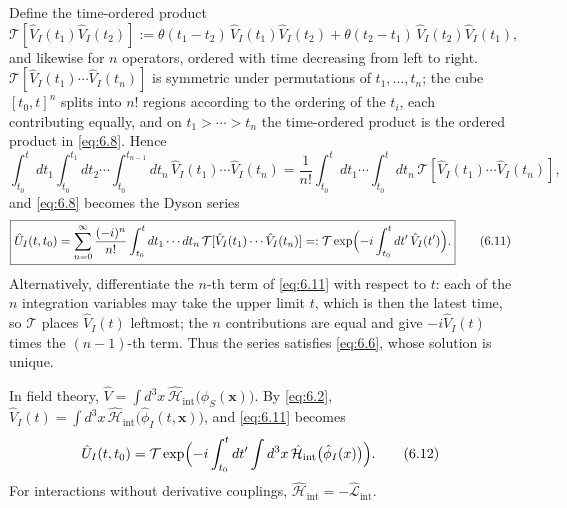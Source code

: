 \documentclass[11pt,a4paper]{article}
\begin{document}
Define the time-ordered product
\begin{equation*}
\mathcal T[\hat V_I(t_1)\hat V_I(t_2)]
:=\theta(t_1-t_2)\,\hat V_I(t_1)\hat V_I(t_2)+\theta(t_2-t_1)\,\hat V_I(t_2)\hat V_I(t_1),
\tag{6.9}\label{eq:6.9}
\end{equation*}
and likewise for $n$ operators, ordered with time decreasing from left to right. $\mathcal T[\hat V_I(t_1)\cdots\hat V_I(t_n)]$ is symmetric under permutations of $t_1,\ldots,t_n$; the cube $[t_0,t]^n$ splits into $n!$ regions according to the ordering of the $t_i$, each contributing equally, and on $t_1>\cdots>t_n$ the time-ordered product is the ordered product in \eqref{eq:6.8}. Hence
\begin{equation*}
\int_{t_0}^{t}dt_1\int_{t_0}^{t_1}dt_2\cdots\int_{t_0}^{t_{n-1}}dt_n\,
\hat V_I(t_1)\cdots\hat V_I(t_n)
=\frac1{n!}\int_{t_0}^{t}dt_1\cdots\int_{t_0}^{t}dt_n\,
\mathcal T[\hat V_I(t_1)\cdots\hat V_I(t_n)],
\tag{6.10}\label{eq:6.10}
\end{equation*}
and \eqref{eq:6.8} becomes the Dyson series
\begin{equation*}
\boxed{
\hat U_I(t,t_0)
=\sum_{n=0}^{\infty}\frac{(-i)^n}{n!}\int_{t_0}^{t}dt_1\cdots dt_n\,
\mathcal T[\hat V_I(t_1)\cdots\hat V_I(t_n)]
=:\mathcal T\exp\Bigl(-i\int_{t_0}^{t}dt'\,\hat V_I(t')\Bigr).
}
\tag{6.11}\label{eq:6.11}
\end{equation*}
Alternatively, differentiate the $n$-th term of \eqref{eq:6.11} with respect to $t$: each of the $n$ integration variables may take the upper limit $t$, which is then the latest time, so $\mathcal T$ places $\hat V_I(t)$ leftmost; the $n$ contributions are equal and give $-i\hat V_I(t)$ times the $(n-1)$-th term. Thus the series satisfies \eqref{eq:6.6}, whose solution is unique.

In field theory, $\hat V=\int d^3x\,\hat{\mathcal H}_{\mathrm{int}}\bigl(\hat\phi_S(\mathbf x)\bigr)$. By \eqref{eq:6.2}, $\hat V_I(t)=\int d^3x\,\hat{\mathcal H}_{\mathrm{int}}\bigl(\hat\phi_I(t,\mathbf x)\bigr)$, and \eqref{eq:6.11} becomes
\begin{equation*}
\hat U_I(t,t_0)=\mathcal T\exp\Bigl(-i\int_{t_0}^{t}dt'\int d^3x\,\hat{\mathcal H}_{\mathrm{int}}\bigl(\hat\phi_I(x)\bigr)\Bigr).
\tag{6.12}\label{eq:6.12}
\end{equation*}
For interactions without derivative couplings, $\hat{\mathcal H}_{\mathrm{int}}=-\hat{\mathcal L}_{\mathrm{int}}$.
\end{document}
